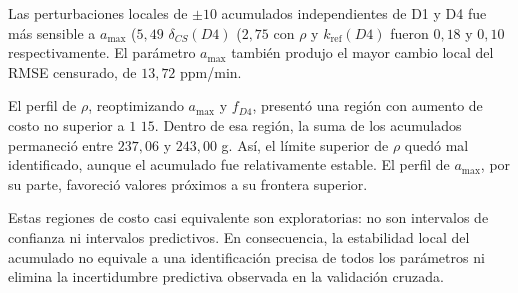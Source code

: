 Las perturbaciones locales de $\pm 10$ %
acumulados independientes de D1 y D4 fue más sensible a $a_{\max}$
($5{,}49$ %
$\delta_{CS}(D4)$ ($2{,}75$ %
con $\rho$ y $k_{\mathrm{ref}}(D4)$ fueron $0{,}18$ y $0{,}10$ %
respectivamente. El parámetro $a_{\max}$ también produjo el mayor
cambio local del RMSE censurado, de $13{,}72$ ppm/min.

El perfil de $\rho$, reoptimizando $a_{\max}$ y $f_{D4}$, presentó una
región con aumento de costo no superior a $1$ %
$15$. Dentro de esa región, la suma de los acumulados permaneció entre
$237{,}06$ y $243{,}00$ g. Así, el límite superior de $\rho$ quedó mal
identificado, aunque el acumulado fue relativamente estable. El perfil
de $a_{\max}$, por su parte, favoreció valores próximos a su frontera
superior.

Estas regiones de costo casi equivalente son exploratorias: no son
intervalos de confianza ni intervalos predictivos. En consecuencia, la
estabilidad local del \co{} acumulado no equivale a una identificación
precisa de todos los parámetros ni elimina la incertidumbre predictiva
observada en la validación cruzada.
